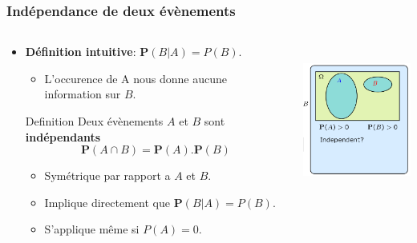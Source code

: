 \documentclass{beamer}
\begin{document}
\begin{frame}[<+->]
  \frametitle{Indépendance de deux évènements}

  \begin{columns}
    \begin{column}{0.6\textwidth}
      \begin{itemize}
        \scriptsize
        \item \textbf{Définition intuitive}: $\mathbf{P}(B|A) = P(B)$.
          \begin{itemize}
            \tiny
            \item L'occurence de A nous donne aucune information sur $B$.
          \end{itemize}
        \pause 
          \begin{block}{Definition}
            \scriptsize
            Deux évènements $A$ et $B$ sont \alert{\textbf{indépendants}} 
            $$
            \mathbf{P}(A\cap B) = \mathbf{P}(A).\mathbf{P}(B)
            $$
          \end{block}
      \begin{itemize}
        \scriptsize
        \item Symétrique par rapport a $A$ et $B$.\\[8pt]
        \item  Implique directement que  $\mathbf{P}(B|A) = P(B)$.\\[8pt]
        \item S'applique même si $P(A) = 0$.
      \end{itemize}
            
      \end{itemize}
      
    \end{column}
    \begin{column}{0.4\textwidth}
        \centering
        \includegraphics[width=4cm,height=5cm]{test_independence.png}
    \end{column}
  \end{columns}
\end{frame}
\end{document}
